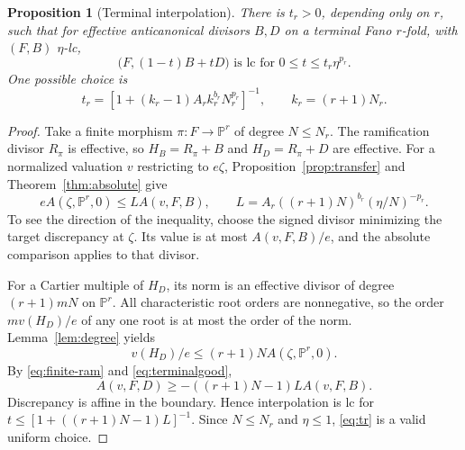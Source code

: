 \documentclass[11pt,reqno]{amsart}
\numberwithin{equation}{section}
\newtheorem{proposition}[theorem]{Proposition}
\theoremstyle{definition}
\theoremstyle{remark}
\newcommand{\PP}{\mathbb P}
\begin{document}
\begin{proposition}[Terminal interpolation]\label{prop:terminalinterp}
There is $t_r>0$, depending only on $r$, such that for effective anticanonical divisors $B,D$ on a terminal Fano $r$-fold, with $(F,B)$ $\eta$-lc,
\[
 \bigl(F,(1-t)B+tD\bigr)\text{ is lc for }0\le t\le t_r\eta^{p_r}.
\]
One possible choice is
\begin{equation}\label{eq:tr}
 t_r=\left[1+(k_r-1)A_r k_r^{b_r}N_r^{p_r}\right]^{-1},
 \qquad k_r=(r+1)N_r.
\end{equation}
\end{proposition}
\begin{proof}
Take a finite morphism $\pi:F\to\PP^r$ of degree $N\le N_r$. The ramification divisor $R_\pi$ is effective, so $H_B=R_\pi+B$ and $H_D=R_\pi+D$ are effective. For a normalized valuation $v$ restricting to $e\zeta$, Proposition~\ref{prop:transfer} and Theorem~\ref{thm:absolute} give
\begin{equation}\label{eq:terminalgood}
 eA(\zeta,\PP^r,0)\le L A(v,F,B),\qquad
 L=A_r((r+1)N)^{b_r}(\eta/N)^{-p_r}.
\end{equation}
To see the direction of the inequality, choose the signed divisor minimizing the target discrepancy at $\zeta$. Its value is at most $A(v,F,B)/e$, and the absolute comparison applies to that divisor.

For a Cartier multiple of $H_D$, its norm is an effective divisor of degree $(r+1)mN$ on $\PP^r$. All characteristic root orders are nonnegative, so the order $mv(H_D)/e$ of any one root is at most the order of the norm. Lemma~\ref{lem:degree} yields
\[
 v(H_D)/e\le(r+1)N A(\zeta,\PP^r,0).
\]
By \eqref{eq:finite-ram} and \eqref{eq:terminalgood},
\[
 A(v,F,D)\ge-((r+1)N-1)L A(v,F,B).
\]
Discrepancy is affine in the boundary. Hence interpolation is lc for $t\le[1+((r+1)N-1)L]^{-1}$. Since $N\le N_r$ and $\eta\le1$, \eqref{eq:tr} is a valid uniform choice.
\end{proof}
\end{document}
